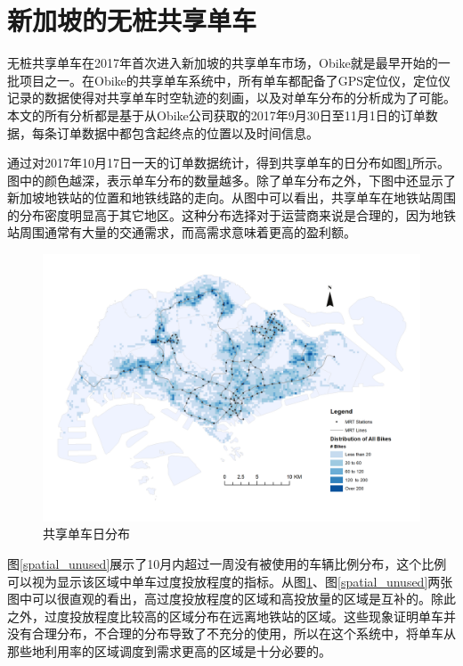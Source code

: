 \documentclass[]{tongjithesis}
\numberwithin{equation}{chapter}
\begin{document}
\section{新加坡的无桩共享单车}
无桩共享单车在2017年首次进入新加坡的共享单车市场，Obike就是最早开始的一批项目之一。在Obike的共享单车系统中，所有单车都配备了GPS定位仪，定位仪记录的数据使得对共享单车时空轨迹的刻画，以及对单车分布的分析成为了可能。本文的所有分析都是基于从Obike公司获取的2017年9月30日至11月1日的订单数据，每条订单数据中都包含起终点的位置以及时间信息。

通过对2017年10月17日一天的订单数据统计，得到共享单车的日分布如图\ref{spatial_aday}所示。图中的颜色越深，表示单车分布的数量越多。除了单车分布之外，下图中还显示了新加坡地铁站的位置和地铁线路的走向。从图中可以看出，共享单车在地铁站周围的分布密度明显高于其它地区。这种分布选择对于运营商来说是合理的，因为地铁站周围通常有大量的交通需求，而高需求意味着更高的盈利额。

\begin{figure}[H]
	\centering
	\includegraphics[width= 0.9 \textwidth]{figures_main/spatial_distribution_aday.png}
	\caption{共享单车日分布}
	\label{spatial_aday}
\end{figure}

图\ref{spatial_unused}展示了10月内超过一周没有被使用的车辆比例分布，这个比例可以视为显示该区域中单车过度投放程度的指标。从图\ref{spatial_aday}、图\ref{spatial_unused}两张图中可以很直观的看出，高过度投放程度的区域和高投放量的区域是互补的。除此之外，过度投放程度比较高的区域分布在远离地铁站的区域。这些现象证明单车并没有合理分布，不合理的分布导致了不充分的使用，所以在这个系统中，将单车从那些地利用率的区域调度到需求更高的区域是十分必要的。
\end{document}
